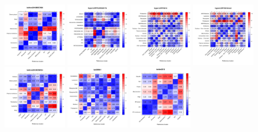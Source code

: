 \documentclass[12pt]{article}\usepackage[]{graphicx}\usepackage[]{color}
\begin{document}
\begin{figure}[p]
  \centering
  \includegraphics[width = 0.24\textwidth]{./figure/allhmaps-1.pdf}
  \includegraphics[width = 0.24\textwidth]{./figure/allhmaps-2.pdf}
  \includegraphics[width = 0.24\textwidth]{./figure/allhmaps-3.pdf}
  \includegraphics[width = 0.24\textwidth]{./figure/allhmaps-4.pdf}
  \includegraphics[width = 0.24\textwidth]{./figure/allhmaps-5.pdf}
  \includegraphics[width = 0.24\textwidth]{./figure/allhmaps-6.pdf}
  \includegraphics[width = 0.24\textwidth]{./figure/allhmaps-7.pdf}

\end{figure}
\end{document}

